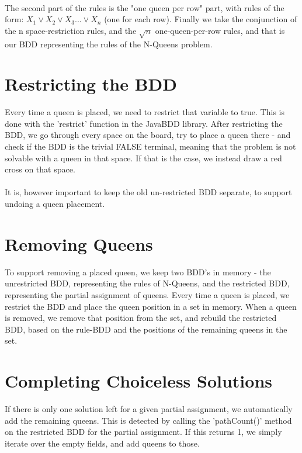 \documentclass{llncs}
\begin{document}
\paragraph{}
The second part of the rules is the "one queen per row" part, with rules of the form:
$X_1 \lor X_2 \lor X_3 ... \lor X_n$ (one for each row). Finally we take the conjunction of the n space-restriction rules, and the $\sqrt{n}$ one-queen-per-row rules, and that is our BDD representing the rules of the N-Queens problem.
\section{Restricting the BDD}
Every time a queen is placed, we need to restrict that variable to true. This is done with the 'restrict' function in the JavaBDD library. After restricting the BDD, we go through every space on the board, try to place a queen there - and check if the BDD is the trivial FALSE terminal, meaning that the problem is not solvable with a queen in that space. If that is the case, we instead draw a red cross on that space.
\paragraph{}
It is, however important to keep the old un-restricted BDD separate, to support undoing a queen placement.
\section{Removing Queens}
To support removing a placed queen, we keep two BDD's in memory - the unrestricted BDD, representing the rules of N-Queens, and the restricted BDD, representing the partial assignment of queens. Every time a queen is placed, we restrict the BDD and place the queen position in a set in memory. When a queen is removed, we remove that position from the set, and rebuild the restricted BDD, based on the rule-BDD and the positions of the remaining queens in the set.
\section{Completing Choiceless Solutions}
If there is only one solution left for a given partial assignment, we automatically add the remaining queens. This is detected by calling the 'pathCount()' method on the restricted BDD for the partial assignment. If this returns 1, we simply iterate over the empty fields, and add queens to those.
\end{document}
